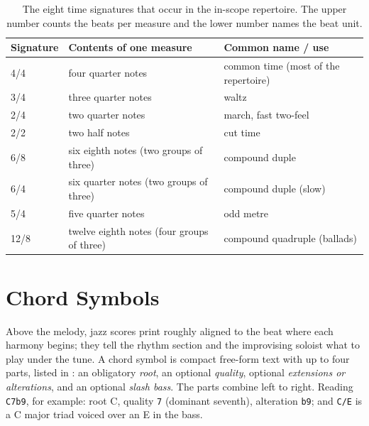 \begin{table}[htbp]
    \centering
    \caption{The eight time signatures that occur in the in-scope repertoire.
    The upper number counts the beats per measure and the lower number names the beat
    unit.}
    \label{tab:time-sigs}
    \small
    \setlength{\tabcolsep}{8pt}
    \renewcommand{\arraystretch}{1.2}
    \begin{tabular}{@{} l l l @{}}
        \toprule
        \textbf{Signature} & \textbf{Contents of one measure} & \textbf{Common name / use} \\
        \midrule
        4/4  & four quarter notes                          & common time (most of the repertoire) \\
        3/4  & three quarter notes                         & waltz \\
        2/4  & two quarter notes                           & march, fast two-feel \\
        2/2  & two half notes                              & cut time \\
        6/8  & six eighth notes (two groups of three)      & compound duple \\
        6/4  & six quarter notes (two groups of three)     & compound duple (slow) \\
        5/4  & five quarter notes                          & odd metre \\
        12/8 & twelve eighth notes (four groups of three)  & compound quadruple (ballads) \\
        \bottomrule
    \end{tabular}
\end{table}

\section{Chord Symbols}
\label{sec:chord-symbols-primer}

Above the melody, jazz scores print  roughly aligned to the beat where
each harmony begins; they tell the rhythm section and the improvising soloist what to play
under the tune.
A chord symbol is compact free-form text with up to four parts, listed in
: an obligatory \emph{root}, an optional \emph{quality}, optional
\emph{extensions or alterations}, and an optional \emph{slash bass}.
The parts combine left to right.
Reading \texttt{C7b9}, for example: root C, quality \texttt{7} (dominant
seventh), alteration \texttt{b9}; and \texttt{C/E} is a C major triad voiced
over an E in the bass.

